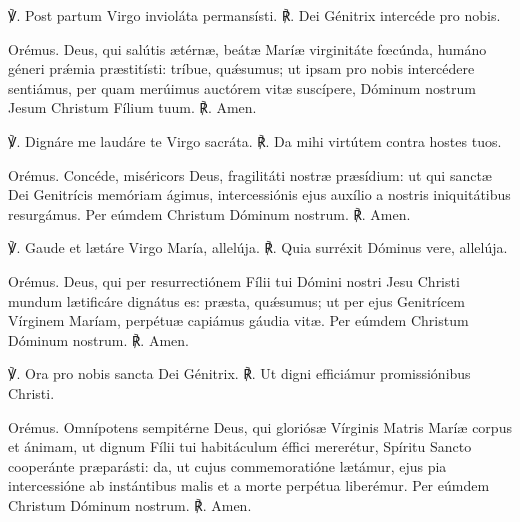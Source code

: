 
℣. Post partum Virgo invioláta permansísti.
℟. Dei Génitrix intercéde pro nobis.

Orémus.
Deus, qui salútis ætérnæ, 
beátæ Maríæ virginitáte fœcúnda,
humáno géneri prǽmia præstitísti:
tríbue, quǽsumus; ut ipsam pro nobis intercédere sentiámus,
per quam merúimus auctórem vitæ suscípere,
Dóminum nostrum Jesum Christum Fílium tuum.
℟. Amen.

\noindent \hrulefill



℣. Dignáre me laudáre te Virgo sacráta.
℟. Da mihi virtútem contra hostes tuos.

Orémus.
Concéde, miséricors Deus, fragilitáti nostræ præsídium:
ut qui sanctæ Dei Genitrícis memóriam ágimus,
intercessiónis ejus auxílio a nostris iniquitátibus resurgámus.
Per eúmdem Christum Dóminum nostrum.
℟. Amen. 

\pagebreak



\vspace{2mm}
℣. Gaude et lætáre Virgo María, allelúja.
℟. Quia surréxit Dóminus vere, allelúja.

\vspace{3mm}
Orémus.
Deus, qui per resurrectiónem Fílii tui Dómini nostri Jesu Christi
mundum lætificáre dignátus es:
præsta, quǽsumus; ut per ejus Genitrícem Vírginem Maríam,
perpétuæ capiámus gáudia vitæ.
Per eúmdem Christum Dóminum nostrum.
℟. Amen. 

\noindent \hrulefill



\vspace{2mm}
℣. Ora pro nobis sancta Dei Génitrix.
℟. Ut digni efficiámur promissiónibus Christi.

\vspace{3mm}
Orémus.
Omnípotens sempitérne Deus,
qui gloriósæ Vírginis Matris Maríæ corpus et ánimam,
ut dignum Fílii tui habitáculum éffici mererétur,
Spíritu Sancto cooperánte præparásti:
da, ut cujus commemoratióne lætámur,
ejus pia intercessióne ab instántibus malis et a morte perpétua liberémur.
Per eúmdem Christum Dóminum nostrum. 
℟. Amen.

